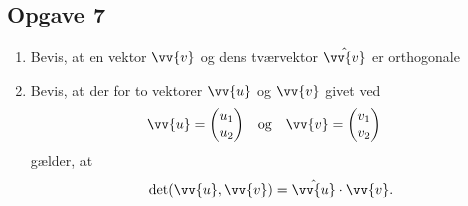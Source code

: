 \subsection*{Opgave 7}
\begin{enumerate}[label=\roman*)]
	\item Bevis, at en vektor $\vv{v}$ og dens tværvektor $\hat{\vv{v}}$ er orthogonale
	\item Bevis, at der for to vektorer $\vv{u}$ og $\vv{v}$ givet ved
	\begin{align*}
		&\vv{u} =
		\begin{pmatrix}
			u_1 \\ u_2
		\end{pmatrix}
		& 
		&\textnormal{og} 
		&
		&\vv{v} =
		\begin{pmatrix}
			v_1 \\ v_2
		\end{pmatrix}
	\end{align*}
	gælder, at
	\begin{align*}
		\det(\vv{u},\vv{v}) = \hat{\vv{u}}\cdot \vv{v}.
	\end{align*}
\end{enumerate}